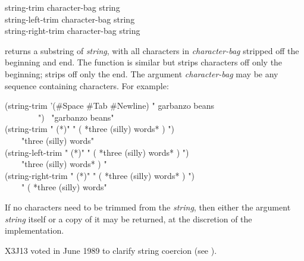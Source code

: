 \begin{defun}[Function]
string-trim character-bag string \\
string-left-trim character-bag string \\
string-right-trim character-bag string

 returns a substring of {\it string}, with all characters in
{\it character-bag} stripped off the beginning and end.
The function  is similar but strips characters
off only the beginning;  strips off only the end.
The argument {\it character-bag} may be any sequence containing
characters.
For example:
\begin{lisp}
(string-trim '(\#{\Xbackslash}Space \#{\Xbackslash}Tab \#{\Xbackslash}Newline) " garbanzo beans \\
~~~~~~~~") \EV\ "garbanzo beans" \\
(string-trim " (*)" " ( *three (silly) words* ) ") \\
~~~\EV\ "three (silly) words" \\
(string-left-trim " (*)" " ( *three (silly) words* ) ") \\
~~~\EV\ "three (silly) words* ) " \\
(string-right-trim " (*)" " ( *three (silly) words* ) ") \\
~~~\EV\ " ( *three (silly) words"
\end{lisp}
If no characters need to be trimmed from the {\it string},
then either the argument {\it string} itself or a copy of it may
be returned, at the discretion of the implementation.

\begin{newer}
X3J13 voted in June 1989 
to clarify string coercion (see ).
\end{newer}
\end{defun}

